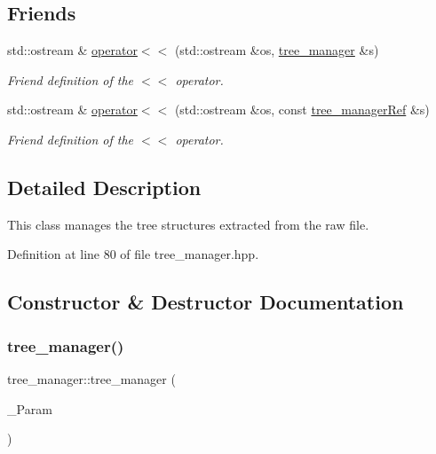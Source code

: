 \subsection*{Friends}
\begin{DoxyCompactItemize}
\item 
std\+::ostream \& \hyperlink{classtree__manager_acf76c2fed025dbf61487c2b187bb9f99}{operator$<$$<$} (std\+::ostream \&os, \hyperlink{classtree__manager}{tree\+\_\+manager} \&s)
\begin{DoxyCompactList}\small\item\em Friend definition of the $<$$<$ operator. \end{DoxyCompactList}\item 
std\+::ostream \& \hyperlink{classtree__manager_aca200eafe7978efae4b3fe91fb2c3751}{operator$<$$<$} (std\+::ostream \&os, const \hyperlink{tree__manager_8hpp_a96ff150c071ce11a9a7a1e40590f205e}{tree\+\_\+manager\+Ref} \&s)
\begin{DoxyCompactList}\small\item\em Friend definition of the $<$$<$ operator. \end{DoxyCompactList}\end{DoxyCompactItemize}


\subsection{Detailed Description}
This class manages the tree structures extracted from the raw file. 

Definition at line 80 of file tree\+\_\+manager.\+hpp.



\subsection{Constructor \& Destructor Documentation}
\mbox{\label{classtree__manager_ad534a11d39d51b9d41f35a6c40cafe13}} 
\subsubsection{\texorpdfstring{tree\+\_\+manager()}{tree\_manager()}}
{\footnotesize\ttfamily tree\+\_\+manager\+::tree\+\_\+manager (\begin{DoxyParamCaption}\item[{const \hyperlink{Parameter_8hpp_a37841774a6fcb479b597fdf8955eb4ea}{Parameter\+Const\+Ref} \&}]{\+\_\+\+Param }\end{DoxyParamCaption})\hspace{0.3cm}{\ttfamily [explicit]}}



